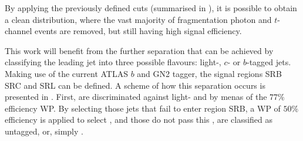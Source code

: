 By applying the previously defined cuts (summarised in \Tab{\ref{fig:evt_selection:sr:signal_regions_scheme}}), it is possible to obtain a clean \myj distribution, where the vast majority of fragmentation photon and \(t\)-channel events are removed, but still having high signal efficiency. 

This work will benefit from the further separation that can be achieved by classifying the leading jet into three possible flavours: light-, \(c\)- or \(b\)-tagged jets. Making use of the current \ac{ATLAS} \(b\) and \cjet GN2 tagger, the signal regions SRB SRC and SRL can be defined. A scheme of how this separation occurs is presented in \Fig{\ref{fig:evt_selection:sr:signal_regions_scheme}}. First, \bjets are discriminated against light- and \cjets by menas of the \(77\%\) \btag efficiency \ac{WP}. By selecting those jets that fail to enter region SRB, a \ctagger \ac{WP} of \(50\%\) \ctag efficiency is applied to select \cjets, and those do not pass this \ctagger, are classified as untagged, or, simply \ljets.

